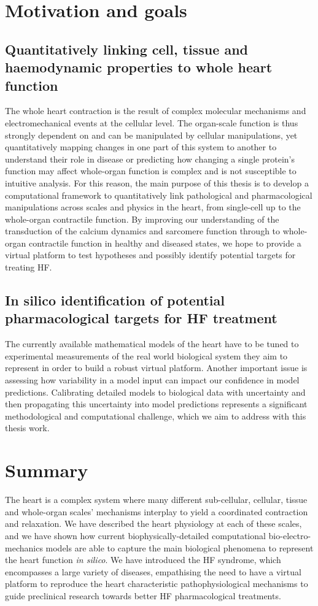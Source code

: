 %
%
%
\section{Motivation and goals}\label{sec:ch1motivation_and_goals}

%
%
%
\subsection{Quantitatively linking cell, tissue and haemodynamic properties to whole heart function}
The whole heart contraction is the result of complex molecular mechanisms and electromechanical events at the cellular level. The organ-scale function is thus strongly dependent on and can be manipulated by cellular manipulations, yet quantitatively mapping changes in one part of this system to another to understand their role in disease or predicting how changing a single protein's function may affect whole-organ function is complex and is not susceptible to intuitive analysis. For this reason, the main purpose of this thesis is to develop a computational framework to quantitatively link pathological and pharmacological manipulations across scales and physics in the heart, from single-cell up to the whole-organ contractile function. By improving our understanding of the transduction of the calcium dynamics and sarcomere function through to whole-organ contractile function in healthy and diseased states, we hope to provide a virtual platform to test hypotheses and possibly identify potential targets for treating HF.


%
%
%
\subsection{In silico identification of potential pharmacological targets for HF treatment}
The currently available mathematical models of the heart have to be tuned to experimental measurements of the real world biological system they aim to represent in order to build a robust virtual platform. Another important issue is assessing how variability in a model input can impact our confidence in model predictions. Calibrating detailed models to biological data with uncertainty and then propagating this uncertainty into model predictions represents a significant methodological and computational challenge, which we aim to address with this thesis work.


%
%
%
\section{Summary}\label{sec:ch1summary}
The heart is a complex system where many different sub-cellular, cellular, tissue and whole-organ scales' mechanisms interplay to yield a coordinated contraction and relaxation. We have described the heart physiology at each of these scales, and we have shown how current biophysically-detailed computational bio-electro-mechanics models are able to capture the main biological phenomena to represent the heart function \textit{in silico}. We have introduced the HF syndrome, which encompasses a large variety of diseases, empathising the need to have a virtual platform to reproduce the heart characteristic pathophysiological mechanisms to guide preclinical research towards better HF pharmacological treatments.